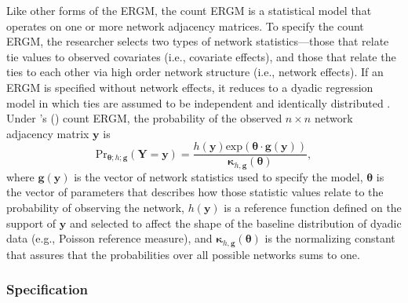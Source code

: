 \documentclass[reqno,onecolumn,letterpaper,12pt]{article}
\newcommand\citeapos[1]{\citeauthor{#1}'s (\citeyear{#1})}
\begin{document}
Like other forms of the ERGM, the count ERGM is a statistical model that operates on one or more network adjacency matrices. To specify the count ERGM, the researcher selects two types of network statistics---those that relate tie values to observed covariates (i.e., covariate effects), and those that relate the ties to each other via high order network structure (i.e., network effects). If an ERGM is specified without network effects, it reduces to a dyadic regression model in which ties are assumed to be independent and identically distributed \citep{cranmer2011inferential}. Under \citeapos{krivitsky2012exponential} count ERGM, the probability of the observed $n \times n$ network adjacency matrix $\bm{y}$ is $$ \text{Pr}_{\bm{\theta};h;\bm{g}}( \bm{Y}=\bm{y} )=\frac{ h(\bm{y})\text{exp}( \bm {\theta} \cdot \bm{g} (\bm{y}) )}{\bm{\kappa}_{h,\bm{g}}(\bm{\theta})},$$ where $\bm{g}( \bm{y} )$ is the vector of network statistics used to specify the model, $\bm{\theta}$ is the vector of parameters that describes how those statistic values relate to the probability of observing the network, $h(\bm{y})$ is a reference function defined on the support of $\bm{y}$ and selected to affect the shape of the baseline distribution of dyadic data (e.g., Poisson reference measure), and $\bm{\kappa}_{h,\bm{g}}(\bm{\theta})$ is the normalizing constant that assures that the probabilities over all possible networks sums to one.


\subsubsection{Specification}
\end{document}
